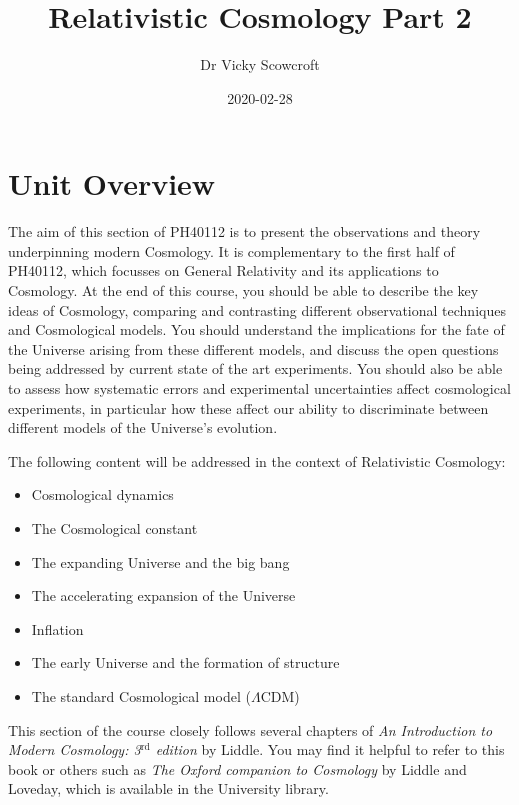 \documentclass[11pt,a4paper,notoc]{tufte-handout}
\title{Relativistic Cosmology Part 2}
\author{Dr Vicky Scowcroft}
\date{2020-02-28}
\begin{document}
\maketitle

{
\hypersetup{linkcolor=}
\setcounter{tocdepth}{2}
\tableofcontents
}
\hypertarget{unit-overview}{%
\section*{Unit Overview}\label{unit-overview}}

The aim of this section of PH40112 is to present the observations and
theory underpinning modern Cosmology. It is complementary to the first
half of PH40112, which focusses on General Relativity and its
applications to Cosmology. At the end of this course, you should be
able to describe the key ideas of Cosmology, comparing and contrasting
different observational techniques and Cosmological models. You should
understand the implications for the fate of the Universe arising from
these different models, and discuss the open questions being addressed
by current state of the art experiments. You should also be able to
assess how systematic errors and experimental uncertainties affect
cosmological experiments, in particular how these affect our ability
to discriminate between different models of the Universe's evolution.

The following content will be addressed in the context of Relativistic
Cosmology:

\begin{itemize}
\item
  Cosmological dynamics
\item
  The Cosmological constant
\item
  The expanding Universe and the big bang
\item
  The accelerating expansion of the Universe
\item
  Inflation
\item
  The early Universe and the formation of structure
\item
  The standard Cosmological model (\(\Lambda\)CDM)
\end{itemize}

This section of the course closely follows several chapters of \emph{An
Introduction to Modern Cosmology: 3\(^{\text{rd}}\) edition} by Liddle.
You may find it helpful to refer to this book or others such as \emph{The
Oxford companion to Cosmology} by Liddle and Loveday, which is
available in the University library.
\end{document}
